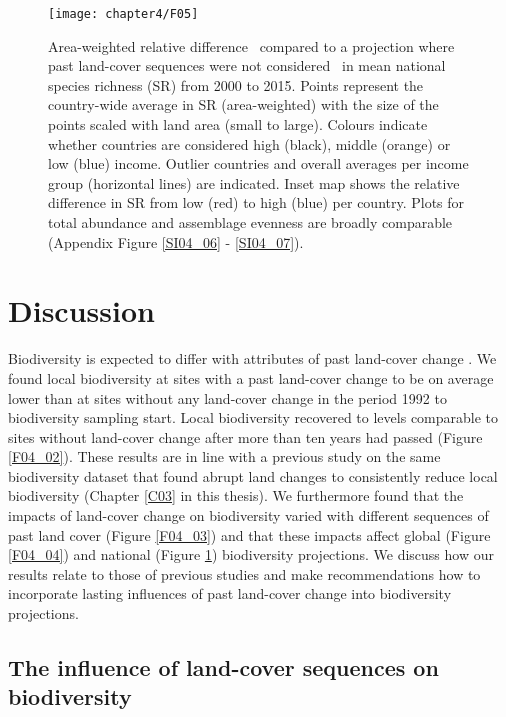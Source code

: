\begin{figure}[hb]
\centering
\texttt{[image: chapter4/F05]}
\caption{ Area-weighted relative difference \textendash\ compared to a projection where past land-cover sequences were not considered \textendash\ in mean national species richness (SR) from 2000 to 2015. Points represent the country-wide average in SR (area-weighted) with the size of the points scaled with land area (small to large). Colours indicate whether countries are considered high (black), middle (orange) or low (blue) income. Outlier countries and overall averages per income group (horizontal lines) are indicated. Inset map shows the relative difference in SR from low (red) to high (blue) per country. Plots for total abundance and assemblage evenness are broadly comparable (Appendix Figure \ref{SI04_06} - \ref{SI04_07}). }
\label{F04_05}
\end{figure}

\section{Discussion}
\label{C04_04}

Biodiversity is expected to differ with attributes of past land-cover change \citep{Watson2014}. We found local biodiversity at sites with a past land-cover change to be on average lower than at sites without any land-cover change in the period 1992 to biodiversity sampling start. Local biodiversity recovered to levels comparable to sites without land-cover change after more than ten years had passed (Figure \ref{F04_02}). These results are in line with a previous study on the same biodiversity dataset that found abrupt land changes to consistently reduce local biodiversity (Chapter \ref{C03} in this thesis). We furthermore found that the impacts of land-cover change on biodiversity varied with different sequences of past land cover (Figure \ref{F04_03}) and that these impacts affect global (Figure \ref{F04_04}) and national (Figure \ref{F04_05}) biodiversity projections. We discuss how our results relate to those of previous studies and make recommendations how to incorporate lasting influences of past land-cover change into biodiversity projections.

\subsection{The influence of land-cover sequences on biodiversity}
\label{C04_0401}

